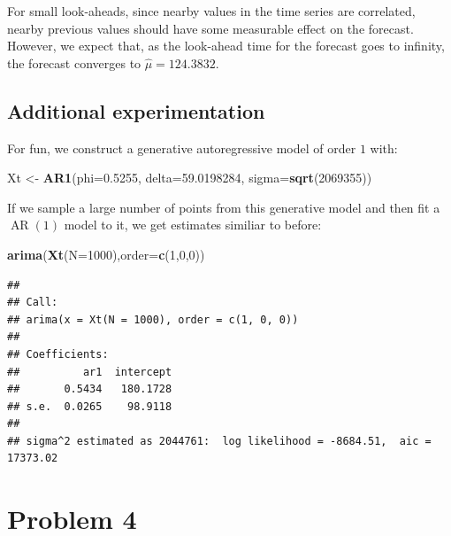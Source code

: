 \documentclass[
]{article}
\newenvironment{Shaded}{\begin{snugshade}}{\end{snugshade}}
\newcommand{\AttributeTok}[1]{\textcolor[rgb]{0.13,0.29,0.53}{#1}}
\newcommand{\DecValTok}[1]{\textcolor[rgb]{0.00,0.00,0.81}{#1}}
\newcommand{\FloatTok}[1]{\textcolor[rgb]{0.00,0.00,0.81}{#1}}
\newcommand{\FunctionTok}[1]{\textcolor[rgb]{0.13,0.29,0.53}{\textbf{#1}}}
\newcommand{\NormalTok}[1]{#1}
\newcommand{\OtherTok}[1]{\textcolor[rgb]{0.56,0.35,0.01}{#1}}
\begin{document}
For small look-aheads, since nearby values in the time series are
correlated, nearby previous values should have some measurable effect on
the forecast. However, we expect that, as the look-ahead time for the
forecast goes to infinity, the forecast converges to
\(\hat\mu = 124.3832\).

\hypertarget{additional-experimentation}{%
\subsection{Additional
experimentation}\label{additional-experimentation}}

For fun, we construct a generative autoregressive model of order \(1\)
with:

\begin{Shaded}
\begin{Highlighting}[]
\NormalTok{Xt }\OtherTok{\textless{}{-}} \FunctionTok{AR1}\NormalTok{(}\AttributeTok{phi=}\FloatTok{0.5255}\NormalTok{, }\AttributeTok{delta=}\FloatTok{59.0198284}\NormalTok{, }\AttributeTok{sigma=}\FunctionTok{sqrt}\NormalTok{(}\DecValTok{2069355}\NormalTok{))}
\end{Highlighting}
\end{Shaded}

If we sample a large number of points from this generative model and
then fit a \(\operatorname{AR}(1)\) model to it, we get estimates
similiar to before:

\begin{Shaded}
\begin{Highlighting}[]
\FunctionTok{arima}\NormalTok{(}\FunctionTok{Xt}\NormalTok{(}\AttributeTok{N=}\DecValTok{1000}\NormalTok{),}\AttributeTok{order=}\FunctionTok{c}\NormalTok{(}\DecValTok{1}\NormalTok{,}\DecValTok{0}\NormalTok{,}\DecValTok{0}\NormalTok{))}
\end{Highlighting}
\end{Shaded}

\begin{verbatim}
## 
## Call:
## arima(x = Xt(N = 1000), order = c(1, 0, 0))
## 
## Coefficients:
##          ar1  intercept
##       0.5434   180.1728
## s.e.  0.0265    98.9118
## 
## sigma^2 estimated as 2044761:  log likelihood = -8684.51,  aic = 17373.02
\end{verbatim}

\hypertarget{problem-4}{%
\section{Problem 4}\label{problem-4}}
\end{document}
